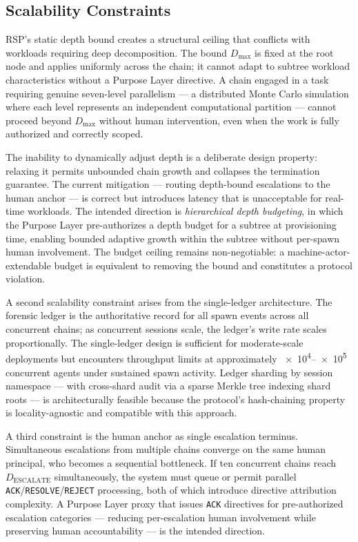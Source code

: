 \subsection{Scalability Constraints}
\label{sec:rs-scalability}

RSP's static depth bound creates a structural ceiling that conflicts with workloads requiring deep decomposition. The bound $D_{\max}$ is fixed at the root node and applies uniformly across the chain; it cannot adapt to subtree workload characteristics without a Purpose Layer directive. A chain engaged in a task requiring genuine seven-level parallelism — a distributed Monte Carlo simulation where each level represents an independent computational partition — cannot proceed beyond $D_{\max}$ without human intervention, even when the work is fully authorized and correctly scoped.

The inability to dynamically adjust depth is a deliberate design property: relaxing it permits unbounded chain growth and collapses the termination guarantee. The current mitigation — routing depth-bound escalations to the human anchor — is correct but introduces latency that is unacceptable for real-time workloads. The intended direction is \emph{hierarchical depth budgeting}, in which the Purpose Layer pre-authorizes a depth budget for a subtree at provisioning time, enabling bounded adaptive growth within the subtree without per-spawn human involvement. The budget ceiling remains non-negotiable: a machine-actor-extendable budget is equivalent to removing the bound and constitutes a protocol violation.

A second scalability constraint arises from the single-ledger architecture. The forensic ledger is the authoritative record for all spawn events across all concurrent chains; as concurrent sessions scale, the ledger's write rate scales proportionally. The single-ledger design is sufficient for moderate-scale deployments but encounters throughput limits at approximately \numrange{e4}{e5} concurrent agents under sustained spawn activity. Ledger sharding by session namespace — with cross-shard audit via a sparse Merkle tree indexing shard roots — is architecturally feasible because the protocol's hash-chaining property is locality-agnostic and compatible with this approach.

A third constraint is the human anchor as single escalation terminus. Simultaneous escalations from multiple chains converge on the same human principal, who becomes a sequential bottleneck. If ten concurrent chains reach $D_{\mathrm{ESCALATE}}$ simultaneously, the system must queue or permit parallel \texttt{ACK}/\texttt{RESOLVE}/\texttt{REJECT} processing, both of which introduce directive attribution complexity. A Purpose Layer proxy that issues \texttt{ACK} directives for pre-authorized escalation categories — reducing per-escalation human involvement while preserving human accountability — is the intended direction.

